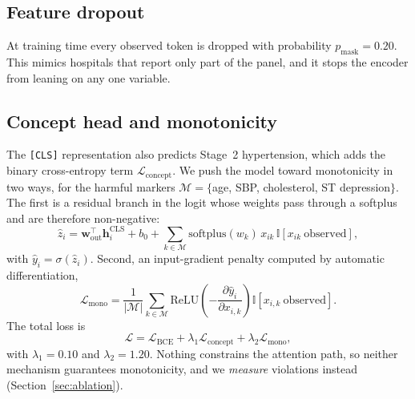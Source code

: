 \documentclass[conference]{IEEEtran}
\begin{document}
\subsection{Feature dropout}
At training time every observed token is dropped with probability $p_{\mathrm{mask}}=0.20$. This mimics hospitals that report only part of the panel, and it stops the encoder from leaning on any one variable.

\subsection{Concept head and monotonicity}
The \texttt{[CLS]} representation also predicts Stage~2 hypertension, which adds the binary cross-entropy term $\mathcal{L}_{\mathrm{concept}}$. We push the model toward monotonicity in two ways, for the harmful markers $\mathcal{M}=\{$age, SBP, cholesterol, ST depression$\}$. The first is a residual branch in the logit whose weights pass through a softplus and are therefore non-negative:
\begin{equation}
\hat z_i=\mathbf{w}_{\mathrm{out}}^{\top}\mathbf{h}^{\mathrm{CLS}}_i+b_0+\sum_{k\in\mathcal{M}}\mathrm{softplus}(w_k)\,x_{ik}\,\mathbb{I}[x_{ik}\ \text{observed}],
\end{equation}
with $\hat y_i=\sigma(\hat z_i)$. Second, an input-gradient penalty computed by automatic differentiation,
\begin{equation}
\mathcal{L}_{\mathrm{mono}}=\frac{1}{|\mathcal{M}|}\sum_{k\in\mathcal{M}}\mathrm{ReLU}\!\left(-\frac{\partial \hat y_i}{\partial x_{i,k}}\right)\mathbb{I}[x_{i,k}\ \text{observed}].
\end{equation}
The total loss is
\begin{equation}
\mathcal{L}=\mathcal{L}_{\mathrm{BCE}}+\lambda_1\mathcal{L}_{\mathrm{concept}}+\lambda_2\mathcal{L}_{\mathrm{mono}},
\end{equation}
with $\lambda_1=0.10$ and $\lambda_2=1.20$. Nothing constrains the attention path, so neither mechanism guarantees monotonicity, and we \emph{measure} violations instead (Section~\ref{sec:ablation}).
\end{document}
